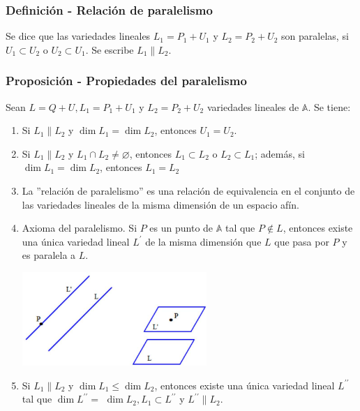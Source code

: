 \documentclass[12pt, a4paper, ones, notitlepage, openany,titlepage]{article}
\begin{document}
\subsubsection{Definición - Relación de paralelismo}
Se dice que las variedades lineales $L_{1}=P_{1}+U_{1}$ y $L_{2}=P_{2}+U_{2}$ son paralelas, si $U_{1} \subset U_{2}$ o $U_{2} \subset U_{1}$. Se escribe $L_{1} \| L_{2}$.

\subsubsection{Proposición - Propiedades del paralelismo}
\noindent Sean $L=Q+U, L_{1}=P_{1}+U_{1}$ y $L_{2}=P_{2}+U_{2}$ variedades lineales de $\mathbb{A}$. Se tiene:
\begin{enumerate}[label=(\arabic*)]
\item Si $L_{1} \| L_{2}$ y $\dim  L_{1}=\dim  L_{2}$, entonces $U_{1}=U_{2}$.

\item Si $L_{1} \| L_{2}$ y $L_{1} \cap L_{2} \neq \varnothing$, entonces $L_{1} \subset L_{2}$ o $L_{2} \subset L_{1}$; además, si $\dim  L_{1}=\dim  L_{2}$, entonces $L_{1}=L_{2}$

\item La ''relación de paralelismo'' es una relación de equivalencia en el conjunto de las variedades lineales de la misma dimensión de un espacio afín.

\item Axioma del paralelismo. Si $P$ es un punto de $\mathbb{A}$ tal que $P \notin L$, entonces existe una única variedad lineal $L^{\prime}$ de la misma dimensión que $L$ que pasa por $P$ y es paralela a $L$.

\includegraphics[max width=7cm, center]{2023_03_01_7659aec5e35f9a9b2d3cg-08}

\item Si $L_{1} \| L_{2}$ y $\dim  L_{1} \leq \dim  L_{2}$, entonces existe una única variedad lineal $L^{\prime \prime}$ tal que $\dim  L^{\prime \prime}=$ $\dim  L_{2}, L_{1} \subset L^{\prime \prime}$ y $L^{\prime \prime} \| L_{2}$.
\end{enumerate}
\end{document}
